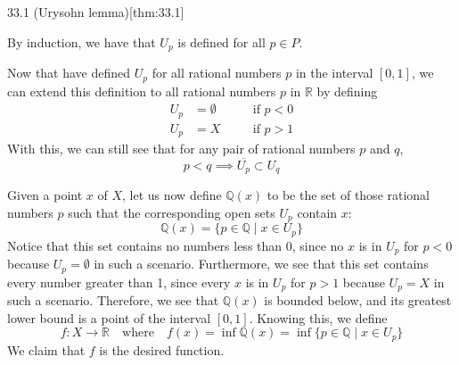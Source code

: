 \begin{thmBox}{33.1 (Urysohn lemma)}[thm:33.1]
\begin{proofBox}
        \baseSkip 

        By induction, we have that \( U_{ p } \) is defined for all \( p \in P \).

        \baseSkip
        Now that have defined \( U_{ p } \) for all rational numbers \( p \) in 
        the interval \( [ 0, 1 ] \), we can extend this definition to all rational
        numbers \( p \) in \( \mathbb{R} \) by defining 
        \begin{equation*}
            \begin{alignedat}{2}
                U_{ p } &= \emptyset    
                &&\quad \text{if } p < 0
                \\
                U_{ p } &= X    
                &&\quad \text{if } p > 1
            \end{alignedat}
        \end{equation*}
        With this, we can still see that for any pair of rational numbers \( p \) and 
        \( q \),
        \begin{equation*}
            p < q
            \implies 
            \overline{ U_{ p } } \subset U_{ q }
        \end{equation*}

        \baseSkip
        Given a point \( x \) of \( X \), let us now define \( \mathbb{Q} ( x ) \) to 
        be the set of those rational numbers \( p \) such that the corresponding open
        sets \( U_{ p } \) contain \( x \):
        \begin{equation*}
            \mathbb{Q} ( x )
            =
            \{ p \in \mathbb{Q} \mid x \in U_{ p } \}
        \end{equation*}
        Notice that this set contains no numbers less than \( 0 \), since no \( x \) is 
        in \( U_{ p } \) for \( p < 0 \) because \( U_{ p } = \emptyset \) in such a 
        scenario.
        Furthermore, we see that this set contains every number greater than 1, since
        every \( x \) is in \( U_{ p } \) for \( p > 1 \) because \( U_{ p } = X \) in
        such a scenario.
        Therefore, we see that \( \mathbb{Q} ( x ) \) is bounded below, and its 
        greatest lower bound is a point of the interval \( [ 0, 1 ] \).
        Knowing this, we define 
        \begin{equation*}
            f: X \rightarrow \mathbb{R}
            \quad \mathrm{where} \quad 
            f ( x ) = \inf \mathbb{Q} ( x ) 
            = \inf \{ p \in \mathbb{Q} \mid x \in U_{ p } \}
        \end{equation*}
        We claim that \( f \) is the desired function.


\end{proofBox}
\end{thmBox}
